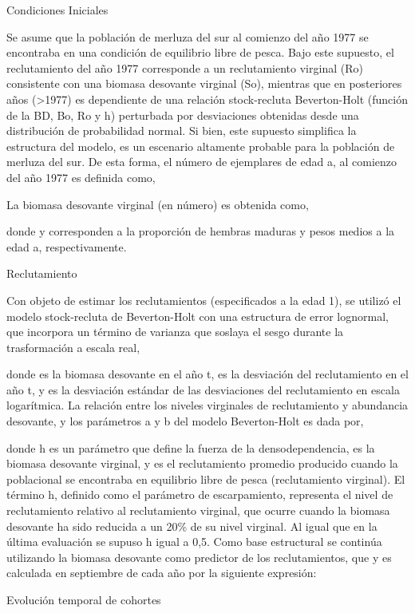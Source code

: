 \documentclass[
  spanish,
]{article}
\begin{document}
Condiciones Iniciales

Se asume que la población de merluza del sur al comienzo del año 1977 se
encontraba en una condición de equilibrio libre de pesca. Bajo este
supuesto, el reclutamiento del año 1977 corresponde a un reclutamiento
virginal (Ro) consistente con una biomasa desovante virginal (So),
mientras que en posteriores años (\textgreater1977) es dependiente de
una relación stock-recluta Beverton-Holt (función de la BD, Bo, Ro y h)
perturbada por desviaciones obtenidas desde una distribución de
probabilidad normal. Si bien, este supuesto simplifica la estructura del
modelo, es un escenario altamente probable para la población de merluza
del sur. De esta forma, el número de ejemplares de edad a, al comienzo
del año 1977 es definida como,

La biomasa desovante virginal (en número) es obtenida como,

donde y corresponden a la proporción de hembras maduras y pesos medios a
la edad a, respectivamente.

Reclutamiento

Con objeto de estimar los reclutamientos (especificados a la edad 1), se
utilizó el modelo stock-recluta de Beverton-Holt con una estructura de
error lognormal, que incorpora un término de varianza que soslaya el
sesgo durante la trasformación a escala real,

donde es la biomasa desovante en el año t, es la desviación del
reclutamiento en el año t, y es la desviación estándar de las
desviaciones del reclutamiento en escala logarítmica. La relación entre
los niveles virginales de reclutamiento y abundancia desovante, y los
parámetros a y b del modelo Beverton-Holt es dada por,

donde h es un parámetro que define la fuerza de la densodependencia, es
la biomasa desovante virginal, y es el reclutamiento promedio producido
cuando la poblacional se encontraba en equilibrio libre de pesca
(reclutamiento virginal). El término h, definido como el parámetro de
escarpamiento, representa el nivel de reclutamiento relativo al
reclutamiento virginal, que ocurre cuando la biomasa desovante ha sido
reducida a un 20\% de su nivel virginal. Al igual que en la última
evaluación se supuso h igual a 0,5. Como base estructural se continúa
utilizando la biomasa desovante como predictor de los reclutamientos,
que y es calculada en septiembre de cada año por la siguiente expresión:

Evolución temporal de cohortes
\end{document}
